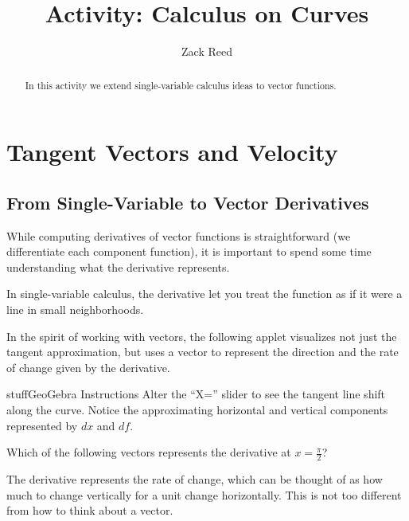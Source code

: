 \documentclass{ximera}
\title{Activity: Calculus on Curves}
\author{Zack Reed}
\begin{document}
\begin{abstract}
In this activity we extend single-variable calculus ideas to vector functions.
\end{abstract}
\maketitle

\section*{Tangent Vectors and Velocity}

\subsection*{From Single-Variable to Vector Derivatives}

While computing derivatives of vector functions is straightforward (we differentiate each component function), it is important to spend some time understanding what the derivative represents.

\begin{problem}
In single-variable calculus, the derivative let you treat the function as if it were a line in small neighborhoods.

In the spirit of working with vectors, the following applet visualizes not just the tangent approximation, but uses a vector to represent the direction and the rate of change given by the derivative.

\begin{expandable}{stuff}{GeoGebra Instructions}
    Alter the ``X='' slider to see the tangent line shift along the curve. Notice the approximating horizontal and vertical components represented by $dx$ and $df$.
\end{expandable}

\begin{center}
\end{center}

Which of the following vectors represents the derivative at $x=\frac{\pi}{2}$?
\begin{multipleChoice}
    \choice{$[.55, 1]$}
    \choice[correct]{$[1, -.55]$}
    \choice{$[.55, -1]$}
    \choice{$[-1, .55]$}
\end{multipleChoice}
\begin{feedback}
The derivative represents the rate of change, which can be thought of as how much to change vertically for a unit change horizontally. This is not too different from how to think about a vector.
\end{feedback}
\end{problem}
\end{document}
